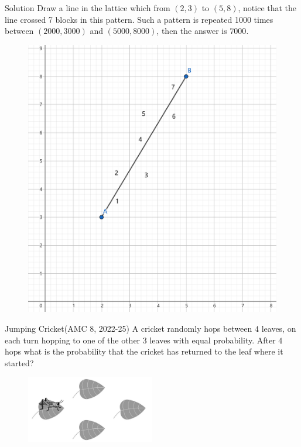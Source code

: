 \documentclass{beamer}
\theoremstyle{definition}
\begin{document}
\begin{frame}{Solution}
    Draw a line in the lattice which from $(2,3)$ to $(5,8)$, notice that the line crossed 7 blocks in this pattern.
    Such a pattern is repeated 1000 times between $(2000,3000)$ and $(5000,8000)$, then the answer is $7000$.
    \begin{figure}
        \centering
        \includegraphics[height=0.5\textheight]{coloring.png}
    \end{figure}
\end{frame}
\begin{frame}{Jumping Cricket(AMC 8, 2022-25)}
    A cricket randomly hops between $4$ leaves,
    on each turn hopping to one of the other $3$ leaves with equal probability. After $4$ hops what is the probability that the cricket has returned to the leaf where it started?
    \begin{figure}
        \centering
        \includegraphics[width=0.5\textwidth]{AMC8-2022-25.jpg}
    \end{figure}
\end{frame}
\end{document}
